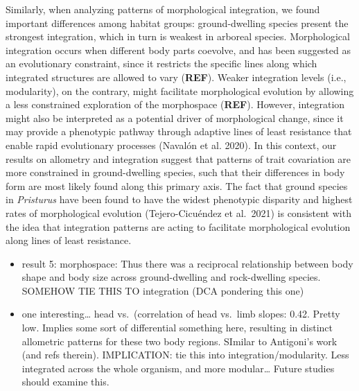 \documentclass[
  11pt,
]{article}
\begin{document}
Similarly, when analyzing patterns of morphological integration, we
found important differences among habitat groups: ground-dwelling
species present the strongest integration, which in turn is weakest in
arboreal species. Morphological integration occurs when different body
parts coevolve, and has been suggested as an evolutionary constraint,
since it restricts the specific lines along which integrated structures
are allowed to vary (\textbf{REF}). Weaker integration levels (i.e.,
modularity), on the contrary, might facilitate morphological evolution
by allowing a less constrained exploration of the morphospace
(\textbf{REF}). However, integration might also be interpreted as a
potential driver of morphological change, since it may provide a
phenotypic pathway through adaptive lines of least resistance that
enable rapid evolutionary processes (Navalón et al. 2020). In this
context, our results on allometry and integration suggest that patterns
of trait covariation are more constrained in ground-dwelling species,
such that their differences in body form are most likely found along
this primary axis. The fact that ground species in \emph{Pristurus} have
been found to have the widest phenotypic disparity and highest rates of
morphological evolution (Tejero-Cicuéndez et al.~2021) is consistent
with the idea that integration patterns are acting to facilitate
morphological evolution along lines of least resistance.

\begin{itemize}
\item
  result 5: morphospace: Thus there was a reciprocal relationship
  between body shape and body size across ground-dwelling and
  rock-dwelling species. SOMEHOW TIE THIS TO integration (DCA pondering
  this one)
\item
  one interesting\ldots{} head vs.~(correlation of head vs.~limb slopes:
  0.42. Pretty low. Implies some sort of differential something here,
  resulting in distinct allometric patterns for these two body regions.
  SImilar to Antigoni's work (and refs therein). IMPLICATION: tie this
  into integration/modularity. Less integrated across the whole
  organism, and more modular\ldots{} Future studies should examine this.
\end{itemize}
\end{document}
